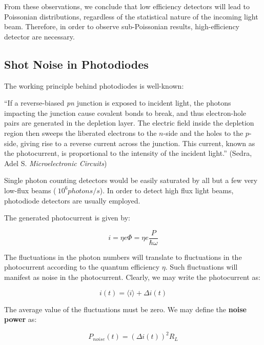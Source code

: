 \documentclass[12pt,a4paper]{report}
\begin{document}
From these observations, we conclude that low efficiency detectors will lead to Poissonian distributions, regardless of the statistical nature of the incoming light beam. Therefore, in order to observe sub-Poissonian results, high-efficiency detector are necessary.

\subsection{Shot Noise in Photodiodes}

The working principle behind photodiodes is well-known:

\begin{displayquote}
    ``If a reverse-biased \textit{pn} junction is exposed to incident light, the photons impacting the junction cause covalent bonds to break, and thus electron-hole pairs are generated in the depletion layer. The electric field inside the depletion region then sweeps the liberated electrons to the $n$-side and the holes to the $p$-side, giving rise to a reverse current across the junction. This current, known as the photocurrent, is proportional to the intensity of the incident light.'' (Sedra, Adel S. \textit{Microelectronic Circuits})
\end{displayquote}

Single photon counting detectors would be easily saturated by all but a few very low-flux beams ($~10^6 photons/s$). In order to detect high flux light beams, photodiode detectors are usually employed. 

The generated photocurrent is given  by:

\begin{equation}
    i=\eta e \Phi=\eta e \frac{P}{\hbar\omega}
\end{equation}

The fluctuations in the photon numbers will translate to fluctuations in the photocurrent according to the quantum efficiency $\eta$. Such fluctuations will manifest as noise in the photocurrent. Clearly, we may write the photocurrent as:

\begin{equation}
    i(t)=\langle i \rangle + \Delta i(t)
\end{equation}

The average value of the fluctuations must be zero. We may define the \textbf{noise power} as:

\begin{equation}
    P_{noise}(t)=(\Delta i(t))^2R_L
\end{equation}
\end{document}
